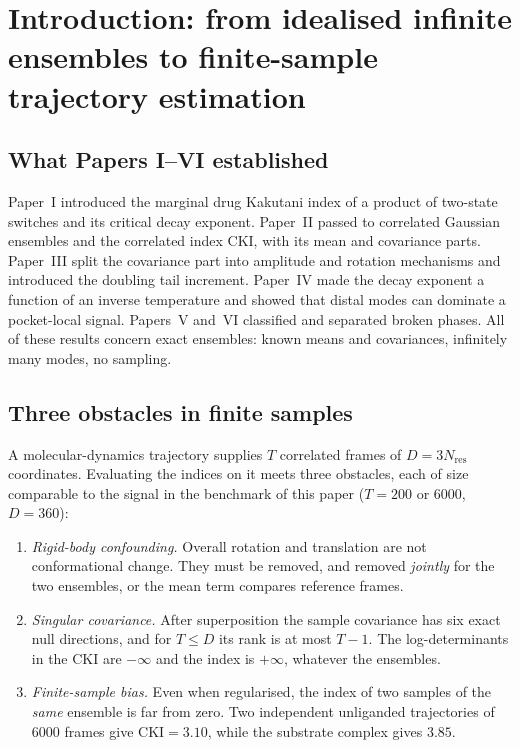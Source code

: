 \documentclass[11pt,reqno]{amsart}
\theoremstyle{plain}
\theoremstyle{definition}
\theoremstyle{remark}
\numberwithin{equation}{section}
\begin{document}
\maketitle
\enlargethispage{\baselineskip}
\tableofcontents

\section{Introduction: from idealised infinite ensembles to finite-sample trajectory estimation}
\label{sec:intro}

\subsection*{What Papers I--VI established}
Paper~I \cite{ChenChen2026I} introduced the marginal drug Kakutani index of a product of two-state switches and its critical decay exponent. Paper~II \cite{ChenChen2026II} passed to correlated Gaussian ensembles and the correlated index CKI, with its mean and covariance parts. Paper~III \cite{ChenChen2026III} split the covariance part into amplitude and rotation mechanisms and introduced the doubling tail increment. Paper~IV \cite{ChenChen2026IV} made the decay exponent a function of an inverse temperature and showed that distal modes can dominate a pocket-local signal. Papers~V and~VI \cite{ChenChen2026V,ChenChen2026VI} classified and separated broken phases. All of these results concern exact ensembles: known means and covariances, infinitely many modes, no sampling.

\subsection*{Three obstacles in finite samples}
A molecular-dynamics trajectory supplies $T$ correlated frames of $D=3N_{\mathrm{res}}$ coordinates. Evaluating the indices on it meets three obstacles, each of size comparable to the signal in the benchmark of this paper ($T=200$ or $6000$, $D=360$):
\begin{enumerate}[label=(\arabic*),leftmargin=*]
\item \emph{Rigid-body confounding.} Overall rotation and translation are not conformational change. They must be removed, and removed \emph{jointly} for the two ensembles, or the mean term compares reference frames.
\item \emph{Singular covariance.} After superposition the sample covariance has six exact null directions, and for $T\le D$ its rank is at most $T-1$. The log-determinants in the CKI are $-\infty$ and the index is $+\infty$, whatever the ensembles.
\item \emph{Finite-sample bias.} Even when regularised, the index of two samples of the \emph{same} ensemble is far from zero. Two independent unliganded trajectories of $6000$ frames give $\mathrm{CKI}=3.10$, while the substrate complex gives $3.85$.
\end{enumerate}
\end{document}

